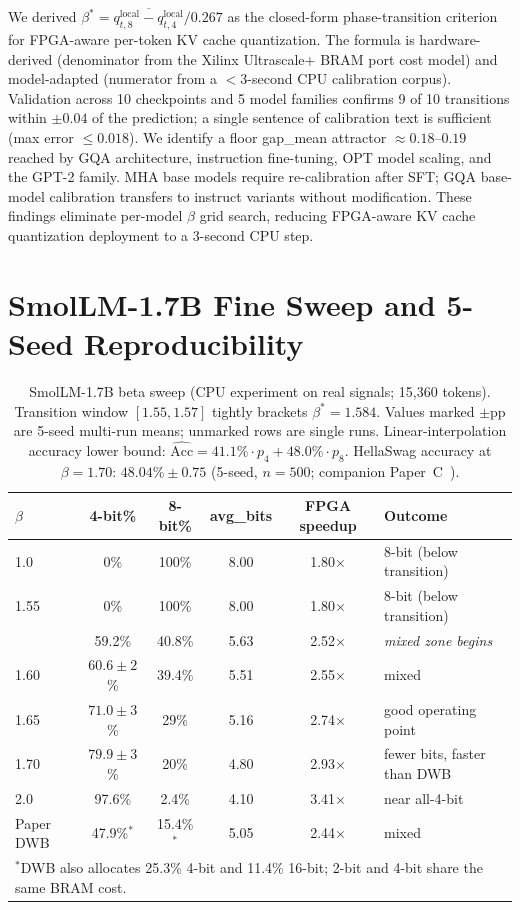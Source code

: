 \documentclass{article}
\begin{document}
We derived $\beta^* = \overline{q_{t,8}^\text{local} - q_{t,4}^\text{local}} / 0.267$ as
the closed-form phase-transition criterion for FPGA-aware per-token KV cache quantization.
The formula is hardware-derived (denominator from the Xilinx Ultrascale+ BRAM port cost
model) and model-adapted (numerator from a $<$3-second CPU calibration corpus).
Validation across 10 checkpoints and 5 model families confirms 9 of 10 transitions within
$\pm 0.04$ of the prediction; a single sentence of calibration text is sufficient
(max error $\leq 0.018$). We identify a floor gap\_mean attractor $\approx 0.18$--$0.19$
reached by GQA architecture, instruction fine-tuning, OPT model scaling, and the GPT-2
family. MHA base models require re-calibration after SFT; GQA base-model calibration
transfers to instruct variants without modification. These findings eliminate per-model
$\beta$ grid search, reducing FPGA-aware KV cache quantization deployment to a
3-second CPU step.

\appendix

\section{SmolLM-1.7B Fine Sweep and 5-Seed Reproducibility}
\label{app:1b7}

\begin{table}[h]
\centering
\caption{SmolLM-1.7B beta sweep (CPU experiment on real signals; 15,360 tokens). Transition
window $[1.55, 1.57]$ tightly brackets $\beta^*{=}1.584$. Values marked $\pm$pp are 5-seed
multi-run means; unmarked rows are single runs. Linear-interpolation accuracy lower bound:
$\hat{\text{Acc}} = 41.1\% \cdot p_4 + 48.0\% \cdot p_8$. HellaSwag accuracy at $\beta{=}1.70$:
$48.04\%\pm0.75$ (5-seed, $n{=}500$; companion Paper~C~\citep{companion_paper_c}).}
\begin{tabular}{lccccl}
\toprule
$\beta$ & 4-bit\% & 8-bit\% & avg\_bits & FPGA speedup & Outcome \\
\midrule
1.0  & 0\%   & 100\% & 8.00 & 1.80$\times$ & 8-bit (below transition) \\
1.55 & 0\%   & 100\% & 8.00 & 1.80$\times$ & 8-bit (below transition) \\
\hdashline
1.57 & 59.2\% & 40.8\% & 5.63 & 2.52$\times$ & \textit{mixed zone begins} \\
1.60 & $60.6\pm2$\% & 39.4\% & 5.51 & 2.55$\times$ & mixed \\
1.65 & $71.0\pm3$\% & 29\%   & 5.16 & 2.74$\times$ & good operating point \\
1.70 & $79.9\pm3$\% & 20\%   & 4.80 & 2.93$\times$ & fewer bits, faster than DWB \\
2.0  & 97.6\%        & 2.4\%  & 4.10 & 3.41$\times$ & near all-4-bit \\
\midrule
Paper DWB & 47.9\%$^*$ & 15.4\%$^*$ & 5.05 & 2.44$\times$ & mixed \\
\bottomrule
\multicolumn{6}{l}{\small $^*$DWB also allocates 25.3\% 4-bit and 11.4\% 16-bit; 2-bit and 4-bit share the same BRAM cost.}
\end{tabular}
\label{tab:sim_1b7}
\end{table}
\end{document}
